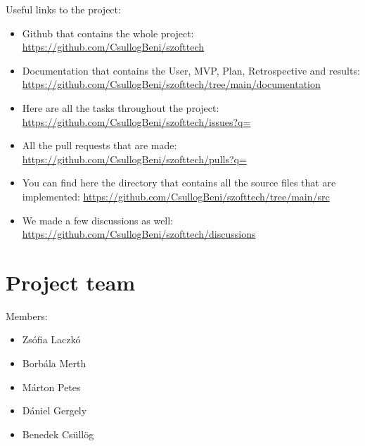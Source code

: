 \documentclass{article}
\begin{document}
Useful links to the project:
\begin{itemize}
    \item Github that contains the whole project: \href{https://github.com/CsullogBeni/szofttech}{https://github.com/CsullogBeni/szofttech}
    \item Documentation that contains the User, MVP, Plan, Retrospective and results: \href{https://github.com/CsullogBeni/szofttech/tree/main/documentation}{https://github.com/CsullogBeni/szofttech/tree/main/documentation}
    \item Here are all the tasks throughout the project: \href{https://github.com/CsullogBeni/szofttech/issues?q=}{https://github.com/CsullogBeni/szofttech/issues?q=}
    \item All the pull requests that are made: \href{https://github.com/CsullogBeni/szofttech/pulls?q=}{https://github.com/CsullogBeni/szofttech/pulls?q=}
    \item You can find here the directory that contains all the source files that are implemented: \href{https://github.com/CsullogBeni/szofttech/tree/main/src}{https://github.com/CsullogBeni/szofttech/tree/main/src}
    \item We made a few discussions as well: \href{https://github.com/CsullogBeni/szofttech/discussions}{https://github.com/CsullogBeni/szofttech/discussions}
\end{itemize}

\section{Project team}
    Members:
    \begin{itemize}
        \item Zsófia Laczkó 
        \item Borbála Merth 
        \item Márton Petes
        \item Dániel Gergely 
        \item Benedek Csüllög
    \end{itemize}
\end{document}
